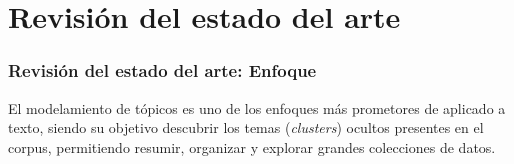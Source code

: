 \documentclass[
	spanish, %
	aspectratio=43, %
	hyperref={pdfencoding=auto,psdextra},
	xcolor={dvipsnames,table,usenames}
]{beamer}
\begin{document}
\begin{frame}
\end{frame}


\section{Revisión del estado del arte}

\begin{frame}
\frametitle{Revisión del estado del arte: Enfoque}
El modelamiento de tópicos es uno de los enfoques más prometores de  aplicado a texto, siendo su objetivo descubrir los temas (\textit{clusters}) ocultos presentes en el corpus, permitiendo resumir, organizar y explorar grandes colecciones de datos.


\end{frame}
\end{document}
